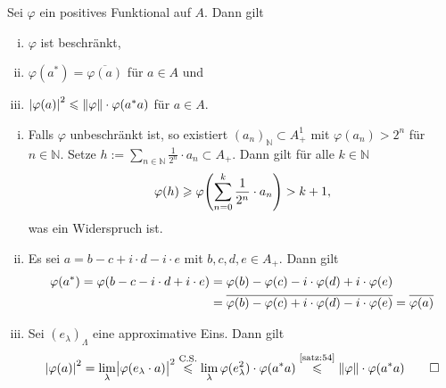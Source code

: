 \begin{satz}[label=satz:53,{name=[Eigenschaften positiver Funktionale]}]
	Sei $\varphi$ ein positives Funktional auf $A$. Dann gilt 
	\begin{enumerate}[(i),itemsep=0pt]
		\item $\varphi$ ist beschränkt,
		\item $\varphi(a^*)=\overline{\varphi(a)}$ für $a \in A$ und
		\item $\abs*{\varphi(a)}^2 \le \norm*{\varphi} \cdot \varphi(a^*a)$ für $a \in A$.
	\end{enumerate}
\end{satz}
\begin{beweis}
	\leavevmode
	\begin{enumerate}[(i)]
		\item Falls $\varphi$ unbeschränkt ist, so existiert $(a_n)_\mathbb{N} \subset A_+^1$ mit $\varphi(a_n) >2^n$ für $n \in \mathbb{N}$.
		Setze $h := \sum_{n \in \mathbb{N}} \frac{1}{2^n} \cdot a_n \subset A_+$.
		Dann gilt für alle $k \in \mathbb{N}$
		\begin{align}
			\varphi(h) \ge \varphi \enbrace*{\sum_{n=0}^{k} \frac{1}{2^n} \cdot a_n} > k+1,
		\end{align}
		was ein Widerspruch ist.
		\item Es sei $a=b-c+ i \cdot d - i \cdot e$ mit $b,c,d,e \in A_+$. Dann gilt
		\begin{align}
			\varphi(a^*) = \varphi \enbrace*{b-c- i \cdot d + i \cdot e} &= \varphi(b) - \varphi(c) - i \cdot \varphi(d) + i \cdot \varphi(e) \\
			&= \overline{\varphi(b) - \varphi(c) + i \cdot \varphi(d) - i \cdot \varphi(e)} = \overline{\varphi(a)}
		\end{align}
		\item Sei $(e_\lambda)_\Lambda$ eine approximative Eins. Dann gilt 
		\[
			\abs*{\varphi(a)}^2 = \lim_\lambda \abs[\big]{\varphi(e_\lambda \cdot a)}^2  \StackText{C.S.}{\le}\lim_\lambda \varphi(e_\lambda^2) \cdot \varphi(a^*a) \StackText{\ref{satz:54}}{\le} \norm*{\varphi} \cdot \varphi(a^*a) \qedhere
		\]
	\end{enumerate}
\end{beweis}

